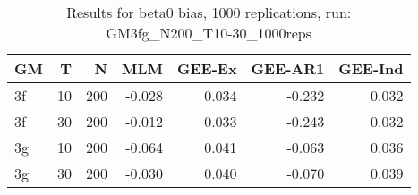 \begin{table}[ht]
\centering
\begin{tabular}{lrrrrrr}
  \hline
GM & T & N & MLM & GEE-Ex & GEE-AR1 & GEE-Ind \\ 
  \hline
3f & 10 & 200 & -0.028 & 0.034 & -0.232 & 0.032 \\ 
  3f & 30 & 200 & -0.012 & 0.033 & -0.243 & 0.032 \\ 
  3g & 10 & 200 & -0.064 & 0.041 & -0.063 & 0.036 \\ 
  3g & 30 & 200 & -0.030 & 0.040 & -0.070 & 0.039 \\ 
   \hline
\end{tabular}
\caption{Results for beta0 bias, 1000 replications, run: GM3fg_N200_T10-30_1000reps} 
\label{tab:beta0_bias}
\end{table}
